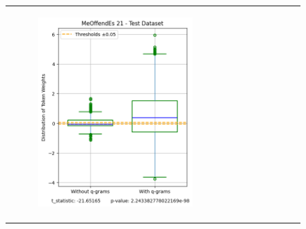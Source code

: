 \documentclass[runningheads,10pt]{llncs}
\begin{document}
\begin{figure}[t]
\begin{tabular}{c c c}
\begin{subfigure}{0.32\textwidth}
            \includegraphics[width=\linewidth]{fig_meoffendes_21_test_0_05.png}
            \label{fig:image5}
        \end{subfigure} &
        \begin{subfigure}{0.32\textwidth}
            \centering

\end{subfigure}
\end{tabular}
\end{figure}
\end{document}

